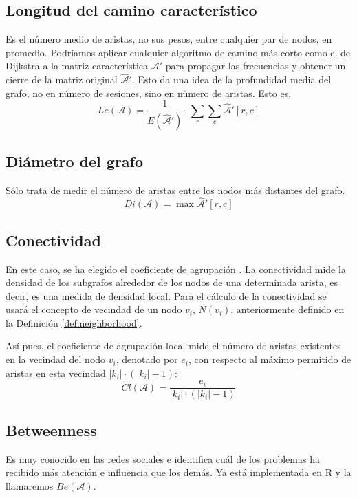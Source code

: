 \subsection{Longitud del camino característico}
Es el número medio de aristas, no sus pesos, entre cualquier par de nodos, en promedio. Podríamos aplicar cualquier algoritmo de camino más corto como el de Dijkstra \cite{cormen2022introduction} a la matriz característica $\mathcal{A}'$ para propagar las frecuencias y obtener un cierre de la matriz original $\hat{\mathcal{A}}'$. Esto da una idea de la profundidad media del grafo, no en número de sesiones, sino en número de aristas. Esto es,
\begin{equation}
Le(\mathcal{A}) = \frac{1}{E(\hat{\mathcal{A}}')} \cdot \sum_r \sum_c \hat{\mathcal{A}}'[r,c]
\end{equation}
\subsection{Diámetro del grafo}
Sólo trata de medir el número de aristas entre los nodos más distantes del grafo.
\begin{equation}
Di(\mathcal{A}) = \max{\hat{\mathcal{A}}'[r,c]}
\end{equation}
\subsection{Conectividad}
En este caso, se ha elegido el coeficiente de agrupación \cite{cormen2022introduction}. La conectividad mide la densidad de los subgrafos alrededor de los nodos de una determinada arista, es decir, es una medida de densidad local. Para el cálculo de la conectividad se usará el concepto de vecindad de un nodo $v_i$, $N(v_i)$, anteriormente definido en la Definición \ref{def:neighborhood}.

Así pues, el coeficiente de agrupación local mide el número de aristas existentes en la vecindad del nodo $v_i$, denotado por $e_i$, con respecto al máximo permitido de aristas en esta vecindad $|k_i| \cdot (|k_i| - 1)$:
\begin{equation}
Cl(\mathcal{A}) = \frac{e_i}{|k_i| \cdot (|k_i| - 1)}
\end{equation}
\subsection{Betweenness}
Es muy conocido en las redes sociales e identifica cuál de los problemas ha recibido más atención e influencia que los demás. Ya está implementada en R y la llamaremos $Be(\mathcal{A})$.
